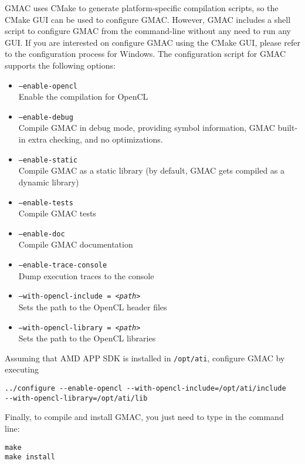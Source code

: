 GMAC uses CMake to generate platform\hyp{}specific compilation scripts, so the CMake GUI can be used 
to configure GMAC\@. However, GMAC includes a shell script to configure GMAC from the 
command\hyp{}line without any need to run any GUI\@. If you are interested on configure GMAC using 
the CMake GUI, please refer to the configuration process for Windows. The configuration script for 
GMAC supports the following options:
\begin{itemize}
\item \texttt{--enable-opencl} \\ Enable the compilation for OpenCL
\item \texttt{--enable-debug} \\ Compile GMAC in debug mode, providing symbol information, GMAC 
built\hyp{}in extra checking, and no optimizations.
\item \texttt{--enable-static} \\ Compile GMAC as a static library (by default, GMAC gets compiled 
as a dynamic library)
\item \texttt{--enable-tests} \\ Compile GMAC tests
\item \texttt{--enable-doc} \\ Compile GMAC documentation
\item \texttt{--enable-trace-console} \\ Dump execution traces to the console
\item \texttt{--with-opencl-include = \emph{<path>}} \\ Sets the path to the OpenCL header files
\item \texttt{--with-opencl-library = \emph{<path>}} \\ Sets the path to the OpenCL libraries
\end{itemize}

Assuming that AMD APP SDK is installed in \texttt{/opt/ati}, configure GMAC by executing
\begin{verbatim}
../configure --enable-opencl --with-opencl-include=/opt/ati/include 
--with-opencl-library=/opt/ati/lib
\end{verbatim}

Finally, to compile and install GMAC, you just need to type in the command line:
\begin{verbatim}
make
make install
\end{verbatim}


